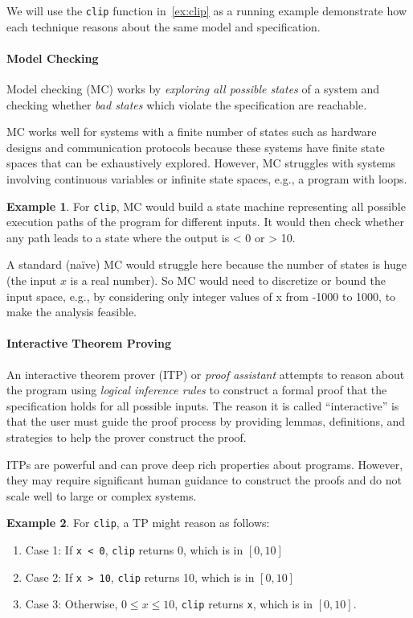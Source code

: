 \documentclass[oneside,11pt,dvipsnames]{book}
\numberwithin{equation}{section}
\theoremstyle{definition}
\newtheorem{example}{Example}[section]
\theoremstyle{remark}
\newcommand{\code}[1]{\texttt{#1}}
\begin{document}
We will use the \code{clip} function in~\autoref{ex:clip} as a running example demonstrate how each technique reasons about the same model and specification.



\paragraph{Model Checking}

Model checking (MC) works by \emph{exploring all possible states} of a system and checking whether \emph{bad states} which violate the specification are reachable. 

MC works well for systems with a finite number of states such as hardware designs and communication protocols because these systems have finite state spaces that can be exhaustively explored. However, MC struggles with systems involving continuous variables or infinite state spaces, e.g., a program with loops. 

\begin{example}
For \code{clip}, MC would build a state machine representing all possible execution paths of the program for different inputs. It would then check whether any path leads to a state where the output is < 0 or > 10. 

A standard (na\"ive) MC would struggle here because the number of states is huge (the input $x$ is a real number). So MC would need to discretize or bound the input space, e.g., by considering only integer values of x from -1000 to 1000, to make the analysis feasible.
\end{example}

\paragraph{Interactive Theorem Proving}  
An interactive theorem prover (ITP) or \emph{proof assistant} attempts to reason about the program using \emph{logical inference rules} to construct a formal proof that the specification holds for all possible inputs. The reason it is called ``interactive'' is that the user must guide the proof process by providing lemmas, definitions, and strategies to help the prover construct the proof.  

ITPs are powerful and can prove deep rich properties about programs. However, they may require significant human guidance to construct the proofs and do not scale well to large or complex systems. 

\begin{example}
For \code{clip}, a TP might reason as follows:
\begin{enumerate}
\item Case 1: If \code{x < 0}, \code{clip} returns 0, which is in $[0, 10]$
\item Case 2: If \code{x > 10}, \code{clip} returns 10, which is in $[0, 10]$
\item Case 3: Otherwise, $0 \leq x \leq 10$, \code{clip} returns \code{x}, which is in $[0, 10]$.
\end{enumerate}
\end{example}
\end{document}
